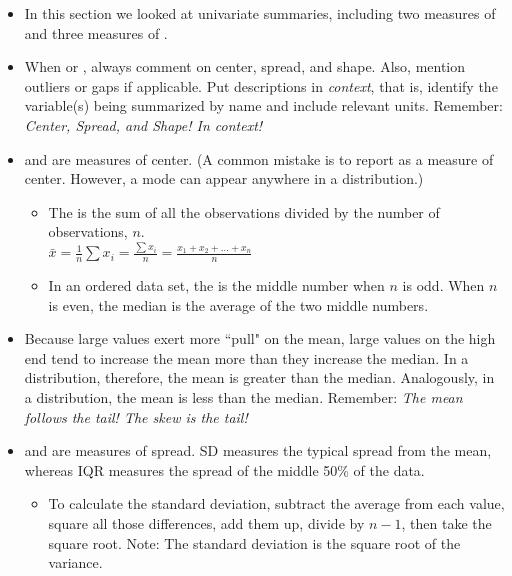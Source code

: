 \begin{itemize}
 \item In this section we looked at univariate summaries, including two measures of  and three measures of .  
\item When  or , always comment on center, spread, and shape.  Also, mention outliers or gaps if applicable.  Put descriptions in \textit{context}, that is, identify the variable(s) being summarized by name and include relevant units.  Remember:  \textit{Center, Spread, and Shape!  In context!}
\item {} and  are measures of center.  (A common mistake is to report  as a measure of center. However, a mode can appear anywhere in a distribution.)  

\begin{itemize}
\item   The  is the sum of all the observations divided by the
  number of observations, $n$. \\
  $\bar{x} = \frac{1}{n}\sum{x_{i}} = \frac{\sum{x_i}}{n}=\frac{x_1 + x_2 + ... + x_n}{n}$\\
  
\item In an ordered data set, the  is the middle number when $n$ is odd.  When $n$ is even, the median is the average of the two middle numbers. 

\end{itemize} 

\item Because large values exert more ``pull" on the mean, large values on the high end tend to increase the mean more than they increase the median.  In a  distribution, therefore, the mean is greater than the median.  Analogously, in a  distribution, the mean is less than the median.  Remember: \textit{The mean follows the tail!  The skew is the tail!}

\item {} and  are measures of spread.  SD measures the typical spread from the mean, whereas IQR measures the spread of the middle 50\% of the data.
\begin{itemize}
\item To calculate the standard deviation, subtract the average from each value, square all those differences, add them up, divide by $n -1$, then take the square root.  Note:  The standard deviation is the square root of the variance. 


\end{itemize}
\end{itemize}
